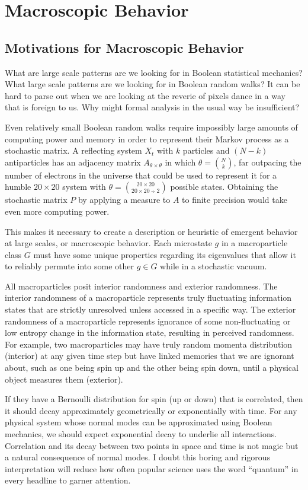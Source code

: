 \documentclass[10pt, a5paper, twoside, openright]{memoir}
\begin{document}
\chapter{Macroscopic Behavior}
\section{Motivations for Macroscopic Behavior}
What are large scale patterns are we looking for in Boolean statistical mechanics? What large scale patterns are we looking for in Boolean random walks? It can be hard to parse out when we are looking at the reverie of pixels dance in a way that is foreign to us. Why might formal analysis in the usual way be insufficient?

Even relatively small Boolean random walks require impossibly large amounts of computing power and memory in order to represent their Markov process as a stochastic matrix. A reflecting system $X_t$ with $k$ particles and $(N-k)$ antiparticles has an adjacency matrix $A_{\theta \times \theta}$ in which $\theta = {N \choose k}$, far outpacing the number of electrons in the universe that could be used to represent it for a humble $20 \times 20$ system with $\theta = {{20 \times 20}\choose{20 \times 20 \div 2}}$ possible states. Obtaining the stochastic matrix $P$ by applying a measure to $A$ to finite precision would take even more computing power. 

This makes it necessary to create a description or heuristic of emergent behavior at large scales, or macroscopic behavior. Each microstate $g$ in a macroparticle class $G$ must have some unique properties regarding its eigenvalues that allow it to reliably permute into some other $g \in G$ while in a stochastic vacuum.

All macroparticles posit interior randomness and exterior randomness. The interior randomness of a macroparticle represents truly fluctuating information states that are strictly unresolved unless accessed in a specific way. The exterior randomness of a macroparticle represents ignorance of some non-fluctuating or low entropy change in the information state, resulting in perceived randomness. For example, two macroparticles may have truly random momenta distribution (interior) at any given time step but have linked memories that we are ignorant about, such as one being spin up and the other being spin down, until a physical object measures them (exterior). 

If they have a Bernoulli distribution for spin (up or down) that is correlated, then it should decay approximately geometrically or exponentially with time. For any physical system whose normal modes can be approximated using Boolean mechanics, we should expect exponential decay to underlie all interactions. Correlation and its decay between two points in space and time is not magic but a natural consequence of normal modes. I doubt this boring and rigorous interpretation will reduce how often popular science uses the word ``quantum'' in every headline to garner attention.
\end{document}
